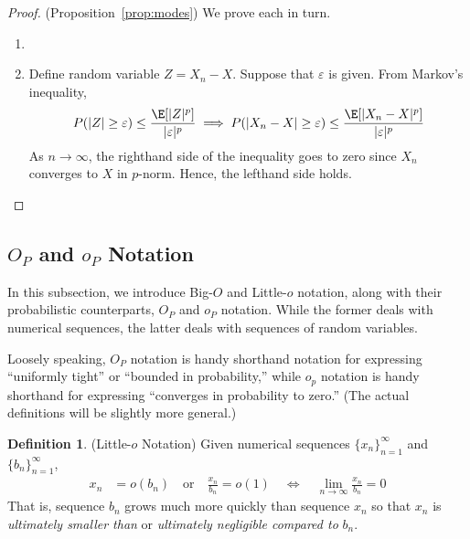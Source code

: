 \documentclass[12pt]{article}
\theoremstyle{plain}
\theoremstyle{definition}
\newtheorem{defn}[thm]{Definition}
\theoremstyle{remark}
\newcommand{\ra}{\rightarrow}
\newcommand{\asto}{\xrightarrow{a.s.}}
\newcommand{\limn}{\lim_{n\rightarrow\infty}}
\begin{document}
\clearpage
\begin{proof}(Proposition~\ref{prop:modes})
We prove each in turn.
\begin{enumerate}
  \item

  \item Define random variable $Z=X_n-X$. Suppose that $\varepsilon$ is
    given. From Markov's inequality,
    \begin{align*}
      P(|Z| \geq \varepsilon) \leq \frac{\E[|Z|^p]}{|\varepsilon|^p}
      \implies
      P(|X_n-X| \geq \varepsilon) \leq \frac{\E[|X_n-X|^p]}{|\varepsilon|^p}
    \end{align*}
    As $n\ra\infty$, the righthand side of the inequality goes to zero
    since $X_n$ converges to $X$ in $p$-norm. Hence, the lefthand side
    holds.
\end{enumerate}
\end{proof}

\clearpage
\subsection{$O_P$ and $o_P$ Notation}

In this subsection, we introduce Big-$O$ and Little-$o$ notation, along
with their probabilistic counterparts, $O_P$ and $o_P$ notation. While
the former deals with numerical sequences, the latter deals with
sequences of random variables.

Loosely speaking, $O_P$ notation is handy shorthand notation for
expressing ``uniformly tight'' or ``bounded in probability,''
while $o_p$ notation is handy shorthand for expressing ``converges in
probability to zero.'' (The actual definitions will be slightly more
general.)


\begin{defn}(Little-$o$ Notation)
Given numerical sequences $\{x_n\}_{n=1}^\infty$ and
$\{b_n\}_{n=1}^\infty$,
\begin{align*}
  x_n &= o(b_n)
  \quad\text{or} \quad
  \frac{x_n}{b_n} = o(1)
  \quad \iff \quad
  \limn \frac{x_n}{b_n} = 0
\end{align*}
That is, sequence $b_n$ grows much more quickly than sequence $x_n$ so
that $x_n$ is \emph{ultimately smaller than} or
\emph{ultimately negligible compared to} $b_n$.
\end{defn}
\end{document}
